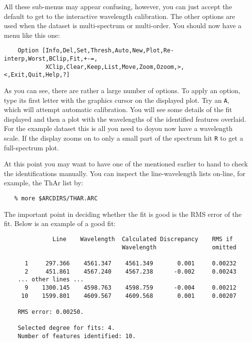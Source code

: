 All these sub-menus may appear confusing, however, you can just accept
the default to get to the interactive wavelength calibration.
The other options are used when the dataset is multi-spectrum or
multi-order.
You should now have a menu like this one:

{
\scspec{\small}{ }
\begin{verbatim}
    Option [Info,Del,Set,Thresh,Auto,New,Plot,Re-interp,Worst,BClip,Fit,+-=,
            XClip,Clear,Keep,List,Move,Zoom,Ozoom,>,<,Exit,Quit,Help,?]
\end{verbatim}
}

As you can see, there are rather a large number of options.  To apply an
option, type its first letter with the graphics cursor on the displayed plot.
Try an \verb+A+, which will attempt automatic calibration.  You will see
some details of the fit displayed and then a plot with the wavelengths of the
identified features overlaid.  For the example dataset this is all you
need to do\scspec{---}{ - }you now have a wavelength scale.
If the display zooms on to only a small part of the spectrum hit
\verb+R+ to get a full-spectrum plot.

At this point you may want to have one of the 
mentioned earlier to hand to check the identifications manually.
You can inspect the line-wavelength lists on-line, for example, the
ThAr list by:

{
\scspec{\small}{ }
\begin{verbatim}
   % more $ARCDIRS/THAR.ARC
\end{verbatim}
}

The important point in deciding whether the fit is good is the RMS error
of the fit.  Below is an example of a good fit:

{
\scspec{\small}{ }
\begin{verbatim}
              Line    Wavelength  Calculated Discrepancy    RMS if
                                  Wavelength                omitted

      1     297.366    4561.347    4561.349       0.001     0.00232
      2     451.861    4567.240    4567.238      -0.002     0.00243
    ... other lines ...
      9    1300.145    4598.763    4598.759      -0.004     0.00212
     10    1599.801    4609.567    4609.568       0.001     0.00207

    RMS error: 0.00250.

    Selected degree for fits: 4.
    Number of features identified: 10.
\end{verbatim}
}

